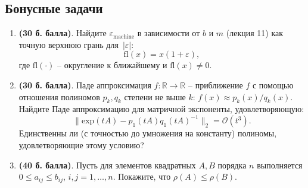 \documentclass[a4paper, 11pt]{article}
\begin{document}
	
	\subsection*{Бонусные задачи}
	\begin{enumerate}
		\item \textbf{(30 б. балла)}.  
		Найдите $\varepsilon_{\mathrm{machine}}$ в зависимости от $b$ и $m$ (лекция 11) как точную верхнюю грань для~$|\varepsilon|$:
		\[
		\mathrm{fl}(x) = x (1+\varepsilon),
		\]
		где $\mathrm{fl}(\cdot)$ -- округление к ближайшему и $\mathrm{fl}(x)\not = 0$. 
		\item \textbf{(30 б. балла)}.   
		Паде аппроксимация $f\colon\mathbb{R}\to\mathbb{R}$ -- приближение $f$ с помощью отношения полиномов $p_k, q_k$ степени не выше $k$: $f(x) \approx p_k(x)/q_k(x)$. Найдите Паде аппроксимацию для матричной экспоненты, удовлетворяющую:
		\[
		\|\mathrm{exp}(tA) - p_1(tA)q_1(tA)^{-1}\|_2 = \mathcal{O}(t^3).
		\]
		Единственны ли (с точностью до умножения на константу) полиномы, удовлетворяющие этому условию?
		\item \textbf{(40 б. балла)}.  
		Пусть для элементов квадратных $A,B$ порядка $n$ выполняется $0\leq a_{ij}\leq b_{ij}$, $i,j=1,\dots,n$. Покажите, что $\rho(A) \leq \rho(B)$.
	\end{enumerate}
	
	
\end{document}
